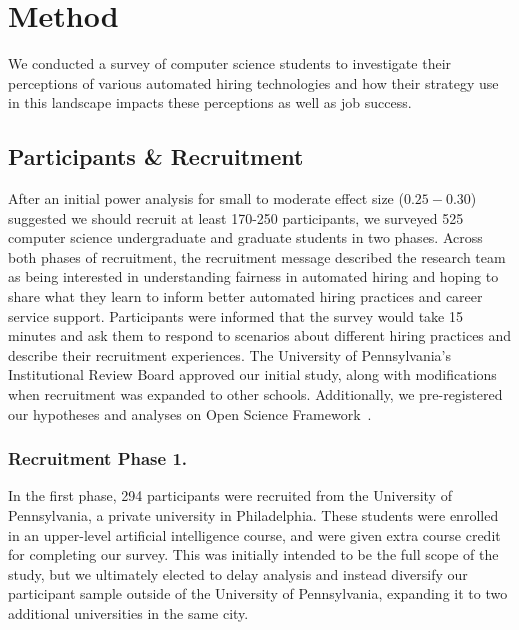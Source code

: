 \section{Method}
\label{sec:methods}

We conducted a survey of computer science students to investigate their perceptions of various automated hiring technologies and how their strategy use in this landscape impacts these perceptions as well as job success.

\subsection{Participants \& Recruitment}
After an initial power analysis for small to moderate effect size ($0.25-0.30$) suggested we should recruit at least 170-250 participants, we surveyed 525 computer science undergraduate and graduate students in two phases. Across both phases of recruitment, the recruitment message described the research team as being interested in understanding fairness in automated hiring and hoping to share what they learn to inform better automated hiring practices and career service support. Participants were informed that the survey would take 15 minutes and ask them to respond to scenarios about different hiring practices and describe their recruitment experiences. The University of Pennsylvania's Institutional Review Board approved our initial study, along with modifications when recruitment was expanded to other schools. Additionally, we pre-registered our hypotheses and analyses on Open Science Framework~\cite{armstrong2023computing}.

\subsubsection{Recruitment Phase 1. }In the first phase, 294 participants were recruited from the University of Pennsylvania, a private university in Philadelphia. These students were enrolled in an upper-level artificial intelligence course, and were given extra course credit for completing our survey. This was initially intended to be the full scope of the study, but we ultimately elected to delay analysis and instead diversify our participant sample outside of the University of Pennsylvania, expanding it to two additional universities in the same city. 

